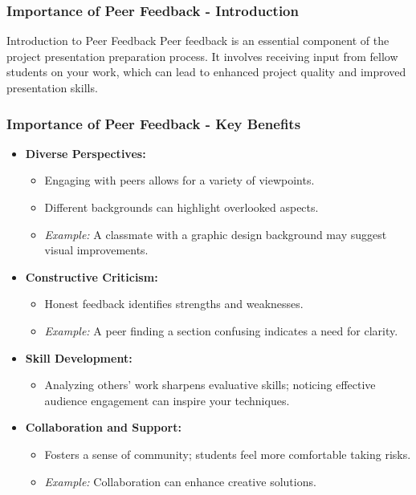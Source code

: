 \documentclass[aspectratio=169]{beamer}
\begin{document}
\begin{frame}[fragile]
    \frametitle{Importance of Peer Feedback - Introduction}
    \begin{block}{Introduction to Peer Feedback}
        Peer feedback is an essential component of the project presentation preparation process. It involves 
        receiving input from fellow students on your work, which can lead to enhanced project quality and improved 
        presentation skills.
    \end{block}
\end{frame}

\begin{frame}[fragile]
    \frametitle{Importance of Peer Feedback - Key Benefits}
    \begin{itemize}
        \item \textbf{Diverse Perspectives:}
        \begin{itemize}
            \item Engaging with peers allows for a variety of viewpoints.
            \item Different backgrounds can highlight overlooked aspects.
            \item \textit{Example:} A classmate with a graphic design background may suggest visual improvements.
        \end{itemize}

        \item \textbf{Constructive Criticism:}
        \begin{itemize}
            \item Honest feedback identifies strengths and weaknesses.
            \item \textit{Example:} A peer finding a section confusing indicates a need for clarity.
        \end{itemize}

        \item \textbf{Skill Development:} 
        \begin{itemize}
            \item Analyzing others' work sharpens evaluative skills; noticing effective audience engagement can inspire your techniques.
        \end{itemize}
        
        \item \textbf{Collaboration and Support:}
        \begin{itemize}
            \item Fosters a sense of community; students feel more comfortable taking risks.
            \item \textit{Example:} Collaboration can enhance creative solutions.
        \end{itemize}
    \end{itemize}
\end{frame}
\end{document}
